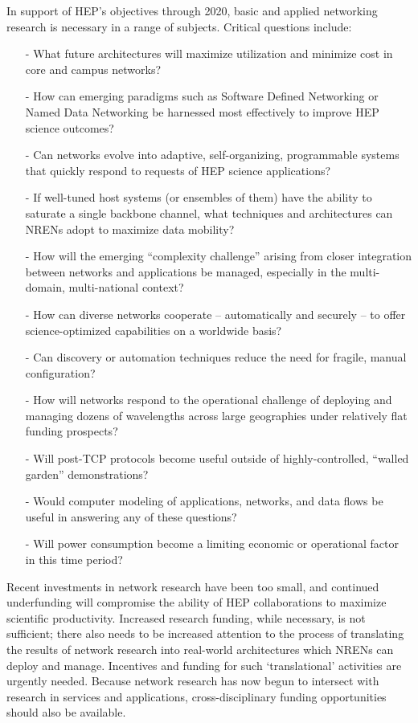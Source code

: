 In support of HEP’s objectives through 2020, basic and applied networking research is necessary in a range of subjects. Critical questions include: 

\begin{itemize}
\item[-] What future architectures will maximize utilization and minimize cost in core and campus networks?
\item[-] How can emerging paradigms such as Software Defined Networking or Named Data Networking be harnessed most effectively to improve HEP science outcomes?
\item[-] Can networks evolve into adaptive, self-organizing, programmable systems that quickly respond to requests of HEP science applications? 
\item[-] If well-tuned host systems (or ensembles of them) have the ability to saturate a single backbone channel, what techniques and architectures can NRENs adopt to maximize data mobility?
\item[-] How will the emerging “complexity challenge” arising from closer integration between networks and applications be managed, especially in the multi-domain, multi-national context?
\item[-] How can diverse networks cooperate – automatically and securely – to offer science-optimized capabilities on a worldwide basis? 
\item[-] Can discovery or automation techniques reduce the need for fragile, manual configuration? 
\item[-] How will networks respond to the operational challenge of deploying  and managing dozens of wavelengths across large geographies under relatively flat funding prospects? 
\item[-] Will post-TCP protocols become useful outside of highly-controlled, “walled garden” demonstrations? 
\item[-] Would computer modeling of applications, networks, and data flows be useful in answering any of these questions?  
\item[-] Will power consumption become a limiting economic or operational factor in this time period? 
\end{itemize}

Recent investments in network research have been too small, and continued underfunding will compromise the ability of HEP collaborations to maximize scientific productivity. Increased research funding, while necessary, is not sufficient; there also needs to be increased attention to the process of translating the results of network research into real-world architectures which NRENs can deploy and manage. Incentives and funding for such ‘translational’ activities are urgently needed. Because network research has now begun to intersect with research in services and applications, cross-disciplinary funding opportunities should also be available.  

